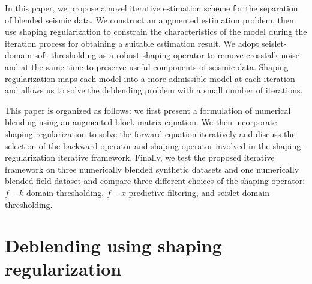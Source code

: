 In this paper, we propose a novel iterative estimation scheme for the separation of blended seismic data. We construct an augmented estimation problem, then use shaping regularization \cite[]{fomel2,fomel3} to constrain the characteristics of the model during the iteration process for obtaining a suitable estimation result. %
We adopt seislet-domain \cite[]{seislet} soft thresholding as a robust shaping operator to remove crosstalk noise and at the same time to preserve useful components of seismic data. Shaping regularization maps each model into a more admissible model at each iteration and allows us to solve the deblending problem with a small number of iterations. 

This paper is organized as follows: we first present a formulation of numerical blending using an augmented block-matrix equation. We then incorporate shaping regularization to solve the forward equation iteratively and discuss the selection of the backward operator and shaping operator involved in the shaping-regularization iterative framework. Finally, we test the proposed iterative framework on three numerically blended synthetic datasets and one numerically blended field dataset and compare three different choices of the shaping operator: $f-k$ domain thresholding, $f-x$ predictive filtering, and seislet domain thresholding. 
 
\section{Deblending using shaping regularization}
